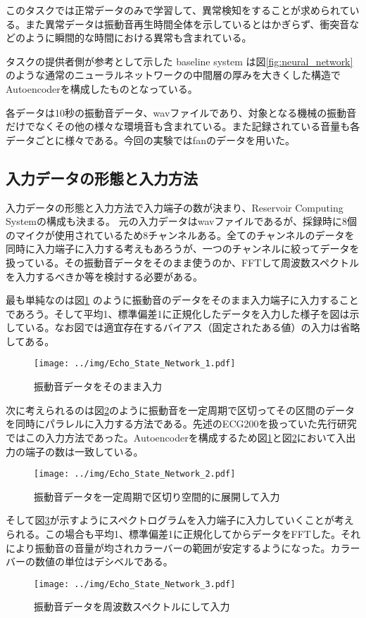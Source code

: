 \documentclass[uplatex,a4paper,10pt]{jsarticle}
\begin{document}
このタスクでは正常データのみで学習して、異常検知をすることが求められている。また異常データは振動音再生時間全体を示しているとはかぎらず、衝突音などのように瞬間的な時間における異常も含まれている。

タスクの提供者側が参考として示した baseline system は図\ref{fig:neural_network}のような通常のニューラルネットワークの中間層の厚みを大きくした構造でAutoencoderを構成したものとなっている。

各データは10秒の振動音データ、wavファイルであり、対象となる機械の振動音だけでなくその他の様々な環境音も含まれている。また記録されている音量も各データごとに様々である。今回の実験ではfanのデータを用いた。

\subsection{入力データの形態と入力方法}
入力データの形態と入力方法で入力端子の数が決まり、Reservoir Computing Systemの構成も決まる。
元の入力データはwavファイルであるが、採録時に8個のマイクが使用されているため8チャンネルある。全てのチャンネルのデータを同時に入力端子に入力する考えもあろうが、一つのチャンネルに絞ってデータを扱っている。その振動音データをそのまま使うのか、FFTして周波数スペクトルを入力するべきか等を検討する必要がある。

最も単純なのは図\ref{fig:echo_state_input_1raw} のように振動音のデータをそのまま入力端子に入力することであろう。そして平均1、標準偏差1に正規化したデータを入力した様子を図は示している。なお図では適宜存在するバイアス（固定されたある値）の入力は省略してある。
\begin{figure}[hbtp]
	\centering
	\texttt{[image: ../img/Echo\_State\_Network\_1.pdf]}
	\caption{振動音データをそのまま入力}
	\label{fig:echo_state_input_1raw}
\end{figure}

次に考えられるのは図\ref{fig:echo_state_input_2raw}のように振動音を一定周期で区切ってその区間のデータを同時にパラレルに入力する方法である。先述のECG200を扱っていた先行研究\cite{esn_ae_simple}ではこの入力方法であった。Autoencoderを構成するため図\ref{fig:echo_state_input_1raw}と図\ref{fig:echo_state_input_2raw}において入出力の端子の数は一致している。
\begin{figure}[hbtp]
	\centering
	\texttt{[image: ../img/Echo\_State\_Network\_2.pdf]}
	\caption{振動音データを一定周期で区切り空間的に展開して入力}
	\label{fig:echo_state_input_2raw}
\end{figure}

そして図\ref{fig:echo_state_input_spectrogram}が示すようにスペクトログラムを入力端子に入力していくことが考えられる。この場合も平均1、標準偏差1に正規化してからデータをFFTした。それにより振動音の音量が均されカラーバーの範囲が安定するようになった。カラーバーの数値の単位はデシベルである。
\begin{figure}[hbtp]
	\centering
	\texttt{[image: ../img/Echo\_State\_Network\_3.pdf]}
	\caption{振動音データを周波数スペクトルにして入力}
	\label{fig:echo_state_input_spectrogram}
\end{figure}
\end{document}

